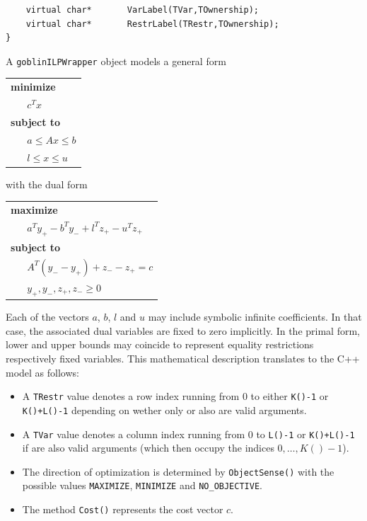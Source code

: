 \documentclass[a4paper,11pt,twoside]{book}
\begin{document}
\begin{multicols}{2}
\begin{mymethods}
\begin{verbatim}
    virtual char*       VarLabel(TVar,TOwnership);
    virtual char*       RestrLabel(TRestr,TOwnership);
}
\end{verbatim}
\end{mymethods}

\noindent
A \verb/goblinILPWrapper/ object models a general form 
\begin{center}
\begin{tabular}{p{3cm}}
\bf{minimize}\\
$\;\;\;\;\;\; c^T x$\\
\bf{subject to}  \\
$\;\;\;\;\;\; a \leq Ax \leq b$ \\
$\;\;\;\;\;\; l \leq x \leq u$
\end{tabular}
\end{center}
with the dual form
\begin{center}
\begin{tabular}{p{5cm}}
\bf{maximize}\\
$\;\;\;\;\;\; a^T y_+ - b^T y_- + l^T z_+ - u^T z_+$\\
\bf{subject to}  \\
$\;\;\;\;\;\; A^T(y_- - y_+) + z_- - z_+ = c$ \\
$\;\;\;\;\;\; y_+, y_-, z_+, z_- \geq 0$
\end{tabular}
\end{center}
Each of the vectors $a$, $b$, $l$ and $u$ may include symbolic infinite
coefficients. In that case, the associated dual variables are fixed to zero
implicitly. In the primal form, lower and upper bounds may coincide to
represent equality restrictions respectively fixed variables. This
mathematical description translates to the C++ model as follows:
\begin{itemize}
\item A \verb/TRestr/ value denotes a row index running from $0$ to either
    \verb/K()-1/ or \verb/K()+L()-1/ depending on wether only  or also  are valid arguments.
\item A \verb/TVar/ value denotes a column index running from $0$ to
    \verb/L()-1/ or \verb/K()+L()-1/ if  are also
    valid arguments (which then occupy the indices $0,\dots,K()-1$).
\item The direction of optimization is determined by \verb/ObjectSense()/ with
    the possible values \verb/MAXIMIZE/, \verb/MINIMIZE/ and \verb/NO_OBJECTIVE/.
\item The method \verb/Cost()/ represents the cost vector $c$.

\end{itemize}
\end{multicols}
\end{document}
